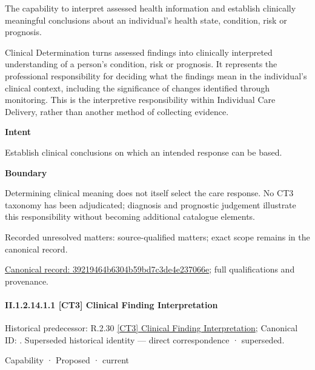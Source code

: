 The capability to interpret assessed health information and establish clinically meaningful conclusions about an individual's health state, condition, risk or prognosis.



Clinical Determination turns assessed findings into clinically interpreted understanding of a person's condition, risk or prognosis. It represents the professional responsibility for deciding what the findings mean in the individual's clinical context, including the significance of changes identified through monitoring. This is the interpretive responsibility within Individual Care Delivery, rather than another method of collecting evidence.



\textbf{Intent}



Establish clinical conclusions on which an intended response can be based.



\textbf{Boundary}



Determining clinical meaning does not itself select the care response. No CT3 taxonomy has been adjudicated; diagnosis and prognostic judgement illustrate this responsibility without becoming additional catalogue elements.


{\small Recorded unresolved matters: source-qualified matters; exact scope remains in the canonical record.}\par
{\footnotesize \href{../../../../../../../continuum/strategy/capability/39219464b6304b59bd7c3de4e237066e.md}{Canonical record: 39219464b6304b59bd7c3de4e237066e}; full qualifications and provenance.}\par
\paragraph*{II.1.2.14.1.1 [CT3] Clinical Finding Interpretation}
\label{navigation:II.1.2.14.1.1}

{\small Historical predecessor: R.2.30 \hyperref[element:cf8ddfca7a8e4ed893ec39b795200d77]{[CT3] Clinical Finding Interpretation}; Canonical ID: \texttt{}. Superseded historical identity — direct correspondence · superseded.}\par
\label{element:deb78ba3b1514074a8ca5bc5da0673f5}
{\small Capability · Proposed · current}\par

